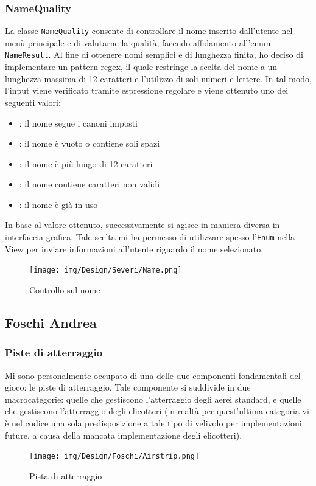 \documentclass[a4paper,12pt]{report}
\begin{document}
\subsubsection{NameQuality}
La classe \texttt{NameQuality} consente di controllare il nome inserito dall'utente nel menù principale e di valutarne la qualità, facendo affidamento all'enum \texttt{NameResult}. Al fine di ottenere nomi semplici e di lunghezza finita, ho deciso di implementare un pattern regex, il quale restringe la scelta del nome a un lunghezza massima di 12 caratteri e l'utilizzo di soli numeri e lettere. In tal modo, l'input viene verificato tramite espressione regolare e viene ottenuto uno dei seguenti valori:
\begin{itemize}
    \item {}: il nome segue i canoni imposti
    \item {}: il nome è vuoto o contiene soli spazi
    \item {}: il nome è più lungo di 12 caratteri
    \item {}: il nome contiene caratteri non validi
    \item {}: il nome è già in uso
\end{itemize}
\noindent In base al valore ottenuto, successivamente si agisce in maniera diversa in interfaccia grafica. Tale scelta mi ha permesso di utilizzare spesso l'\texttt{Enum} nella View per inviare informazioni all'utente riguardo il nome selezionato.

\begin{figure}[H]
    \begin{center}
        \centering
        \texttt{[image: img/Design/Severi/Name.png]}
    \end{center}
    \caption{Controllo sul nome}
    \label{img:name}
\end{figure}

\subsection{Foschi Andrea}
\subsubsection{Piste di atterraggio}
Mi sono personalmente occupato di una delle due componenti fondamentali del gioco: le piste di atterraggio. Tale componente si suddivide in due macrocategorie: quelle che gestiscono l’atterraggio degli aerei standard, e quelle che gestiscono l’atterraggio degli elicotteri (in realtà per quest’ultima categoria vi è nel codice una sola predisposizione a tale tipo di velivolo per implementazioni future, a causa della mancata implementazione degli elicotteri).
\begin{figure}[H]
    \begin{center}
        \centering
        \texttt{[image: img/Design/Foschi/Airstrip.png]}
    \end{center}
    \caption{Pista di atterraggio}
    \label{img:airstrip}
\end{figure}
\end{document}
